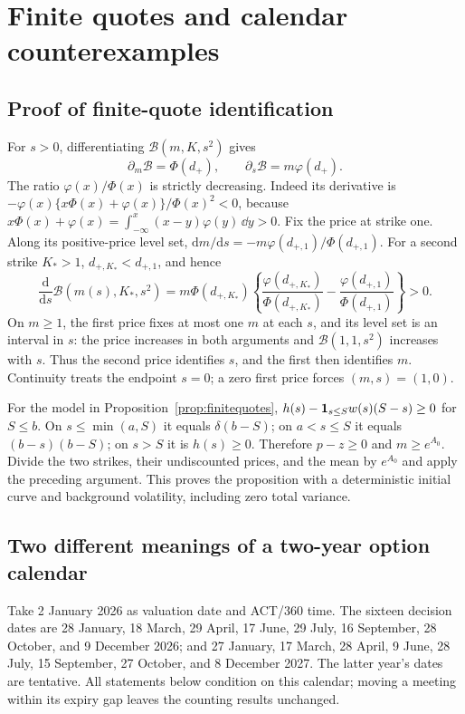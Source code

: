 \section{Finite quotes and calendar counterexamples}\label{app:finitecalendar}
\subsection{Proof of finite-quote identification}
For $s>0$, differentiating $\mathcal B(m,K,s^2)$ gives
\[
\partial_m\mathcal B=\Phi(d_+),\qquad
\partial_s\mathcal B=m\varphi(d_+).
\]
The ratio $\varphi(x)/\Phi(x)$ is strictly decreasing. Indeed its derivative is
$-\varphi(x)\{x\Phi(x)+\varphi(x)\}/\Phi(x)^2<0$, because
$x\Phi(x)+\varphi(x)=\int_{-\infty}^x(x-y)\varphi(y)\,\dd y>0$.
Fix the price at strike one. Along its positive-price level set,
$\mathrm dm/\mathrm ds=-m\varphi(d_{+,1})/\Phi(d_{+,1})$.
For a second strike $K_*>1$, $d_{+,K_*}<d_{+,1}$, and hence
\[
\frac{\mathrm d}{\mathrm ds}\mathcal B(m(s),K_*,s^2)
=m\Phi(d_{+,K_*})
\left\{\frac{\varphi(d_{+,K_*})}{\Phi(d_{+,K_*})}
-\frac{\varphi(d_{+,1})}{\Phi(d_{+,1})}\right\}>0.
\]
On $m\geq1$, the first price fixes at most one $m$ at each $s$, and its level set is an interval in $s$: the price increases in both arguments and $\mathcal B(1,1,s^2)$ increases with $s$. Thus the second price identifies $s$, and the first then identifies $m$. Continuity treats the endpoint $s=0$; a zero first price forces $(m,s)=(1,0)$.

For the model in Proposition~\ref{prop:finitequotes}, $h(s)-\mathbf 1_{s\leq S}w(s)(S-s)\geq0$ for $S\leq b$. On $s\leq\min(a,S)$ it equals $\delta(b-S)$; on $a<s\leq S$ it equals $(b-s)(b-S)$; on $s>S$ it is $h(s)\geq0$. Therefore $p-z\geq0$ and $m\geq e^{A_0}$. Divide the two strikes, their undiscounted prices, and the mean by $e^{A_0}$ and apply the preceding argument. This proves the proposition with a deterministic initial curve and background volatility, including zero total variance.

\subsection{Two different meanings of a two-year option calendar}\label{app:listedcalendar}
Take 2 January 2026 as valuation date and ACT/360 time. The sixteen decision dates are 28 January, 18 March, 29 April, 17 June, 29 July, 16 September, 28 October, and 9 December 2026; and 27 January, 17 March, 28 April, 9 June, 28 July, 15 September, 27 October, and 8 December 2027. The latter year's dates are tentative. All statements below condition on this calendar; moving a meeting within its expiry gap leaves the counting results unchanged.

